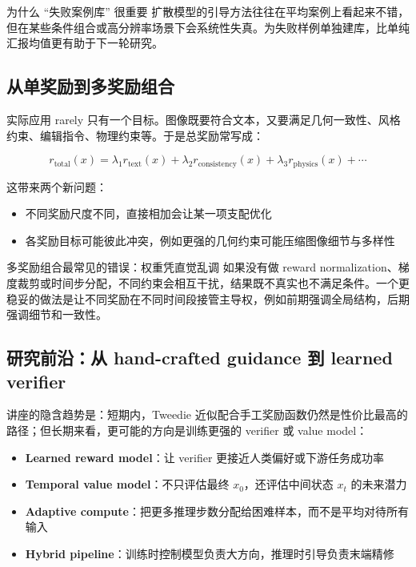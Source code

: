 \documentclass[a4paper]{article}
\begin{document}
\begin{knowledgebox}{为什么 ``失败案例库'' 很重要}
扩散模型的引导方法往往在平均案例上看起来不错，但在某些条件组合或高分辨率场景下会系统性失真。为失败样例单独建库，比单纯汇报均值更有助于下一轮研究。
\end{knowledgebox}

\subsection{从单奖励到多奖励组合}

实际应用 rarely 只有一个目标。图像既要符合文本，又要满足几何一致性、风格约束、编辑指令、物理约束等。于是总奖励常写成：

$$r_{\text{total}}(x) = \lambda_1 r_{\text{text}}(x) + \lambda_2 r_{\text{consistency}}(x) + \lambda_3 r_{\text{physics}}(x) + \cdots$$

这带来两个新问题：

\begin{itemize}
    \item 不同奖励尺度不同，直接相加会让某一项支配优化
    \item 各奖励目标可能彼此冲突，例如更强的几何约束可能压缩图像细节与多样性
\end{itemize}

\begin{warningbox}{多奖励组合最常见的错误：权重凭直觉乱调}
如果没有做 reward normalization、梯度裁剪或时间步分配，不同约束会相互干扰，结果既不真实也不满足条件。一个更稳妥的做法是让不同奖励在不同时间段接管主导权，例如前期强调全局结构，后期强调细节和一致性。
\end{warningbox}

\subsection{研究前沿：从 hand-crafted guidance 到 learned verifier}

讲座的隐含趋势是：短期内，Tweedie 近似配合手工奖励函数仍然是性价比最高的路径；但长期来看，更可能的方向是训练更强的 verifier 或 value model：

\begin{itemize}
    \item \textbf{Learned reward model}：让 verifier 更接近人类偏好或下游任务成功率
    \item \textbf{Temporal value model}：不只评估最终 $x_0$，还评估中间状态 $x_t$ 的未来潜力
    \item \textbf{Adaptive compute}：把更多推理步数分配给困难样本，而不是平均对待所有输入
    \item \textbf{Hybrid pipeline}：训练时控制模型负责大方向，推理时引导负责末端精修
\end{itemize}
\end{document}
